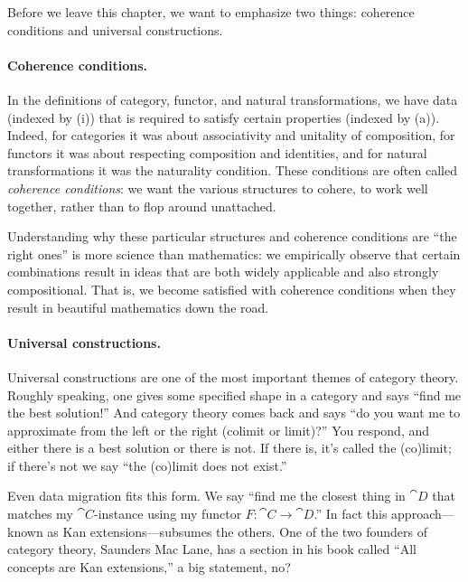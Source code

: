 \documentclass[7Sketches]{subfiles}
\begin{document}
Before we leave this chapter, we want to emphasize two things: coherence conditions and universal constructions.

\paragraph{Coherence conditions.}%
In the definitions of category, functor, and natural transformations, we have
data (indexed by (i)) that is required to satisfy certain properties (indexed by
(a)). Indeed, for categories it was about associativity and unitality of
composition, for functors it was about respecting composition and identities,
and for natural transformations it was the naturality condition. These
conditions are often called \emph{coherence conditions}: we want the various
structures to cohere, to work well together, rather than to flop around
unattached.%
%

Understanding why these particular structures and coherence conditions are ``the right ones'' is more science than mathematics: we empirically observe that certain combinations result in ideas that are both widely applicable and also strongly compositional. That is, we become satisfied with coherence conditions when they result in beautiful mathematics down the road.

\paragraph{Universal constructions.}%

Universal constructions are one of the most important themes of category theory. Roughly speaking, one gives some specified shape in a category and says ``find me the best solution!'' And category theory comes back and says ``do you want me to approximate from the left or the right (colimit or limit)?'' You respond, and either there is a best solution or there is not. If there is, it's called the (co)limit; if there's not we say ``the (co)limit does not exist.'' 

Even data migration fits this form. We say ``find me the closest thing in $\cat{D}$ that matches my $\cat{C}$-instance using my functor $F\colon\cat{C}\to\cat{D}$.'' In fact this approach---known as Kan extensions---subsumes the others. One of the two founders of category theory, Saunders Mac Lane, has a section in his book \cite{MacLane:1998a} called ``All concepts are Kan extensions,'' a big statement, no?
%
\end{document}
